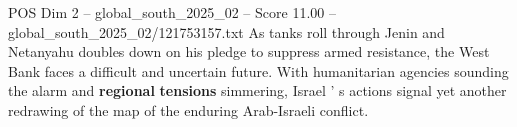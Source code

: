 \begin{textsample}{POS Dim 2 – global\_south\_2025\_02 – Score 11.00 – global\_south\_2025\_02/121753157.txt}
As tanks roll through Jenin and Netanyahu doubles down on his pledge to suppress armed resistance, the West Bank faces a difficult and uncertain future.
With humanitarian agencies sounding the alarm and \textbf{regional} \textbf{tensions} simmering, Israel ' s actions signal yet another redrawing of the map of the enduring Arab-Israeli conflict.

\end{textsample}
